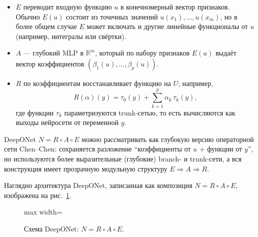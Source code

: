 \documentclass[../NDCNNAI_main.tex]{subfiles}
\begin{document}
\begin{itemize}
  \item $E$ переводит входную функцию $u$ в конечномерный вектор признаков.
  Обычно $E(u)$ состоит из точечных значений $u(x_1),\ldots,u(x_m)$, но в более общем случае
  $E$ может включать и другие линейные функционалы от $u$ (например, интегралы или свёртки).
  \item $A$ --- глубокий MLP в $\mathbb{R}^m$, который по набору признаков $E(u)$ выдаёт вектор коэффициентов
  $(\beta_1(u),\ldots,\beta_p(u))$.
  \item $R$ по коэффициентам восстанавливает функцию на $U$; например,
  $$
  R(\alpha)(y)=\tau_0(y)+\sum_{k=1}^{p}\alpha_k\,\tau_k(y),
  $$
  где функции $\tau_k$ параметризуются trunk-сетью, то есть вычисляются как выходы нейросети от переменной $y$.
\end{itemize}

\begin{remark}
DeepONet $N=R\circ A\circ E$ можно рассматривать как глубокую версию операторной сети Chen--Chen:
сохраняется разложение ``коэффициенты от $u$ + функции от $y$'', но используются более выразительные
(глубокие) branch- и trunk-сети, а вся конструкция имеет прозрачную модульную структуру
$E \Rightarrow A \Rightarrow R$.
\end{remark}
Наглядно архитектура DeepONet, записанная как композиция $N=R\circ A\circ E$, изображена на рис.~\ref{fig:deeponet}.

\begin{figure}[ht!]
\centering
\begin{adjustbox}{max width=\textwidth}
\end{adjustbox}
\caption{Схема DeepONet: $N=R\circ A\circ E$.}
\label{fig:deeponet}
\end{figure}
\end{document}
